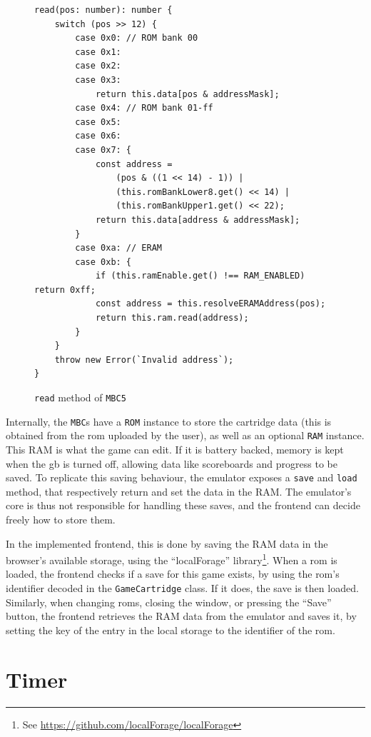 \documentclass[11pt]{informatics-report}
\newcommand{\ftnt}[1]{\footnote{See \url{#1}}}
\begin{document}
\begin{figure}[h]
    \begin{verbatim}
read(pos: number): number {
    switch (pos >> 12) {
        case 0x0: // ROM bank 00
        case 0x1:
        case 0x2:
        case 0x3:
        	return this.data[pos & addressMask];
        case 0x4: // ROM bank 01-ff
        case 0x5:
        case 0x6:
        case 0x7: {
            const address =
                (pos & ((1 << 14) - 1)) |
                (this.romBankLower8.get() << 14) |
                (this.romBankUpper1.get() << 22);
            return this.data[address & addressMask];
        }
        case 0xa: // ERAM
        case 0xb: {
            if (this.ramEnable.get() !== RAM_ENABLED) return 0xff;
            const address = this.resolveERAMAddress(pos);
            return this.ram.read(address);
        }
    }
    throw new Error(`Invalid address`);
}
    \end{verbatim}
    \caption{\texttt{read} method of \texttt{MBC5} \cite[MBC5]{pandoc}}
    \label{fig:mbc-read-switch}
\end{figure}

Internally, the \texttt{MBC}s have a \texttt{ROM} instance to store the cartridge data (this is obtained from the \gls{rom} uploaded by the user), as well as an optional \texttt{RAM} instance. This RAM is what the game can edit. If it is battery backed, memory is kept when the \gls{gb} is turned off, allowing data like scoreboards and progress to be saved. To replicate this saving behaviour, the emulator exposes a \texttt{save} and \texttt{load} method, that respectively return and set the data in the RAM. The emulator's core is thus not responsible for handling these saves, and the frontend can decide freely how to store them.

In the implemented frontend, this is done by saving the RAM data in the browser's available storage, using the ``localForage'' library\ftnt{https://github.com/localForage/localForage}. When a \gls{rom} is loaded, the frontend checks if a save for this game exists, by using the \gls{rom}'s identifier decoded in the \texttt{GameCartridge} class. If it does, the save is then loaded. Similarly, when changing \glspl{rom}, closing the window, or pressing the ``Save'' button, the frontend retrieves the RAM data from the emulator and saves it, by setting the key of the entry in the local storage to the identifier of the \gls{rom}.

\section{Timer}
\end{document}

